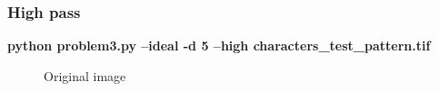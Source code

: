         \pagebreak
        \subsubsection{High pass}

        \small{\textbf{python problem3.py --ideal -d 5 --high characters\_test\_pattern.tif}}

        \begin{figure}[!htb]\centering
            \begin{minipage}{0.45\textwidth}
                \caption{\small{Original image}}
            \end{minipage}
            \begin{minipage}{0.45\textwidth}

\end{minipage}
\end{figure}
